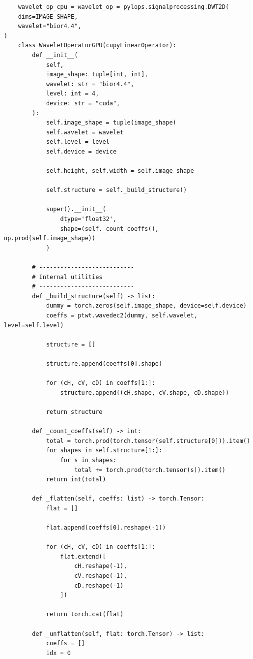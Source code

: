 \begin{verbatim}
    wavelet_op_cpu = wavelet_op = pylops.signalprocessing.DWT2D(
    dims=IMAGE_SHAPE,
    wavelet="bior4.4",
)
    class WaveletOperatorGPU(cupyLinearOperator):
        def __init__(
            self,
            image_shape: tuple[int, int],
            wavelet: str = "bior4.4",
            level: int = 4,
            device: str = "cuda",
        ):
            self.image_shape = tuple(image_shape)
            self.wavelet = wavelet
            self.level = level
            self.device = device

            self.height, self.width = self.image_shape

            self.structure = self._build_structure()

            super().__init__(
                dtype='float32',
                shape=(self._count_coeffs(), np.prod(self.image_shape))
            )

        # ---------------------------
        # Internal utilities
        # ---------------------------
        def _build_structure(self) -> list:
            dummy = torch.zeros(self.image_shape, device=self.device)
            coeffs = ptwt.wavedec2(dummy, self.wavelet, level=self.level)

            structure = []

            structure.append(coeffs[0].shape)

            for (cH, cV, cD) in coeffs[1:]:
                structure.append((cH.shape, cV.shape, cD.shape))

            return structure

        def _count_coeffs(self) -> int:
            total = torch.prod(torch.tensor(self.structure[0])).item()
            for shapes in self.structure[1:]:
                for s in shapes:
                    total += torch.prod(torch.tensor(s)).item()
            return int(total)

        def _flatten(self, coeffs: list) -> torch.Tensor:
            flat = []

            flat.append(coeffs[0].reshape(-1))

            for (cH, cV, cD) in coeffs[1:]:
                flat.extend([
                    cH.reshape(-1),
                    cV.reshape(-1),
                    cD.reshape(-1)
                ])

            return torch.cat(flat)

        def _unflatten(self, flat: torch.Tensor) -> list:
            coeffs = []
            idx = 0


\end{verbatim}
